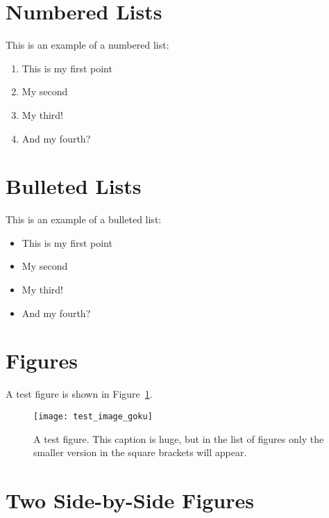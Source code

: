 \blindtext

\section{Numbered Lists}

This is an example of a numbered list:

\begin{enumerate}
	\item This is my first point
	\item My second
	\item My third!
	\item And my fourth?
\end{enumerate}

\blindtext

\section{Bulleted Lists}

This is an example of a bulleted list:

\begin{itemize}
	\item This is my first point
	\item My second
	\item My third!
	\item And my fourth?
\end{itemize}

\blindtext

\section{Figures}

A test figure is shown in Figure~\ref{fig:test1}.

\begin{figure}[ht!] %
	\centering
	\texttt{[image: test\_image\_goku]}
	\caption[This is the short caption for List of Figures]{A test figure.  This caption is huge, but in the list of figures only the smaller version in the square brackets will appear.}
	\label{fig:test1}
\end{figure}

\blindtext

\section{Two Side-by-Side Figures}

